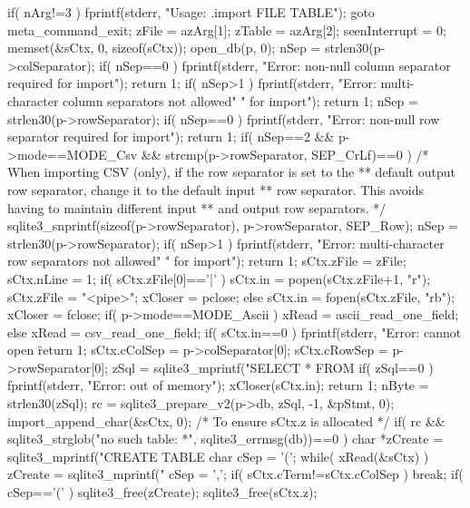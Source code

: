 \begin{Codex}[label=shell.c,numbers=left]
{{    if( nArg!=3 ){
      fprintf(stderr, "Usage: .import FILE TABLE\n");
      goto meta_command_exit;
    }
    zFile = azArg[1];
    zTable = azArg[2];
    seenInterrupt = 0;
    memset(&sCtx, 0, sizeof(sCtx));
    open_db(p, 0);
    nSep = strlen30(p->colSeparator);
    if( nSep==0 ){
      fprintf(stderr, "Error: non-null column separator required for import\n");
      return 1;
    }
    if( nSep>1 ){
      fprintf(stderr, "Error: multi-character column separators not allowed"
                      " for import\n");
      return 1;
    }
    nSep = strlen30(p->rowSeparator);
    if( nSep==0 ){
      fprintf(stderr, "Error: non-null row separator required for import\n");
      return 1;
    }
    if( nSep==2 && p->mode==MODE_Csv && strcmp(p->rowSeparator, SEP_CrLf)==0 ){
      /* When importing CSV (only), if the row separator is set to the
      ** default output row separator, change it to the default input
      ** row separator.  This avoids having to maintain different input
      ** and output row separators. */
      sqlite3_snprintf(sizeof(p->rowSeparator), p->rowSeparator, SEP_Row);
      nSep = strlen30(p->rowSeparator);
    }
    if( nSep>1 ){
      fprintf(stderr, "Error: multi-character row separators not allowed"
                      " for import\n");
      return 1;
    }
    sCtx.zFile = zFile;
    sCtx.nLine = 1;
    if( sCtx.zFile[0]=='|' ){
      sCtx.in = popen(sCtx.zFile+1, "r");
      sCtx.zFile = "<pipe>";
      xCloser = pclose;
    }else{
      sCtx.in = fopen(sCtx.zFile, "rb");
      xCloser = fclose;
    }
    if( p->mode==MODE_Ascii ){
      xRead = ascii_read_one_field;
    }else{
      xRead = csv_read_one_field;
    }
    if( sCtx.in==0 ){
      fprintf(stderr, "Error: cannot open \"%
      return 1;
    }
    sCtx.cColSep = p->colSeparator[0];
    sCtx.cRowSep = p->rowSeparator[0];
    zSql = sqlite3_mprintf("SELECT * FROM %
    if( zSql==0 ){
      fprintf(stderr, "Error: out of memory\n");
      xCloser(sCtx.in);
      return 1;
    }
    nByte = strlen30(zSql);
    rc = sqlite3_prepare_v2(p->db, zSql, -1, &pStmt, 0);
    import_append_char(&sCtx, 0);    /* To ensure sCtx.z is allocated */
    if( rc && sqlite3_strglob("no such table: *", sqlite3_errmsg(db))==0 ){
      char *zCreate = sqlite3_mprintf("CREATE TABLE %
      char cSep = '(';
      while( xRead(&sCtx) ){
        zCreate = sqlite3_mprintf("%
        cSep = ',';
        if( sCtx.cTerm!=sCtx.cColSep ) break;
      }
      if( cSep=='(' ){
        sqlite3_free(zCreate);
        sqlite3_free(sCtx.z);
}}}}
\end{Codex}
